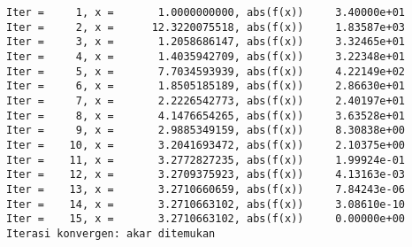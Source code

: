 \documentclass[11pt]{article}
\begin{document}
    \begin{Verbatim}[commandchars=\\\{\}]
Iter =     1, x =       1.0000000000, abs(f(x))     3.40000e+01
Iter =     2, x =      12.3220075518, abs(f(x))     1.83587e+03
Iter =     3, x =       1.2058686147, abs(f(x))     3.32465e+01
Iter =     4, x =       1.4035942709, abs(f(x))     3.22348e+01
Iter =     5, x =       7.7034593939, abs(f(x))     4.22149e+02
Iter =     6, x =       1.8505185189, abs(f(x))     2.86630e+01
Iter =     7, x =       2.2226542773, abs(f(x))     2.40197e+01
Iter =     8, x =       4.1476654265, abs(f(x))     3.63528e+01
Iter =     9, x =       2.9885349159, abs(f(x))     8.30838e+00
Iter =    10, x =       3.2041693472, abs(f(x))     2.10375e+00
Iter =    11, x =       3.2772827235, abs(f(x))     1.99924e-01
Iter =    12, x =       3.2709375923, abs(f(x))     4.13163e-03
Iter =    13, x =       3.2710660659, abs(f(x))     7.84243e-06
Iter =    14, x =       3.2710663102, abs(f(x))     3.08610e-10
Iter =    15, x =       3.2710663102, abs(f(x))     0.00000e+00
Iterasi konvergen: akar ditemukan

    \end{Verbatim}


    
    
    
    
\end{document}
